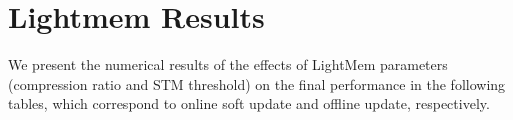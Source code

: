 \section{Lightmem Results}
\label{lightmem_results}

We present the numerical results of the effects of LightMem parameters (compression ratio and STM threshold) on the final performance in the following tables, which correspond to online soft update and offline update, respectively.

